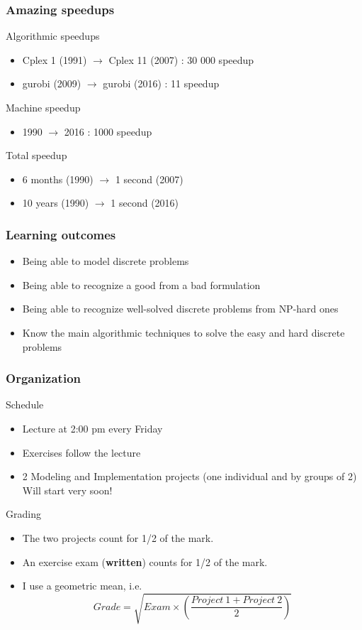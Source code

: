 \documentclass[9pt,handout]{beamer}
\begin{document}
\begin{frame}
\frametitle{Amazing speedups}
\begin{block}{Algorithmic speedups}
\begin{itemize}
\item Cplex 1 (1991) $\rightarrow$ Cplex 11 (2007) : 30 000 speedup
\item gurobi (2009) $\rightarrow$ gurobi (2016) : 11 speedup
\end{itemize}
\end{block}
\begin{block}{Machine speedup}
\begin{itemize}
\item 1990 $\rightarrow$ 2016 : 1000 speedup
\end{itemize}
\end{block}
\begin{block}{Total speedup}
\begin{itemize}
\item 6 months (1990) $\rightarrow$ 1 second (2007)
\item 10 years (1990) $\rightarrow$ 1 second (2016)
\end{itemize}
\end{block}
\end{frame}
\begin{frame}
\frametitle{Learning outcomes}
\begin{itemize}
\item Being able to \alert{model} discrete problems\bigskip
\item Being able to recognize a \alert{good} from a \alert{bad} formulation\bigskip
\item Being able to recognize \alert{well-solved} discrete problems
from \alert{NP-hard} ones\bigskip
\item Know the main algorithmic techniques to solve the easy and hard discrete problems\bigskip
\end{itemize}
\end{frame}
\begin{frame}
\frametitle{Organization}
\begin{block}{Schedule}
\begin{itemize}
\item<1-> Lecture at 2:00 pm every Friday
\item<1-> Exercises follow the lecture 
\item<1-> 2 Modeling and Implementation projects (one individual and by groups of 2)\\
Will start very soon!
\end{itemize}
\end{block}
\begin{block}{Grading}
\begin{itemize}
\item<2-> The two projects count for 1/2 of the mark.
\item<2-> An exercise exam (\textbf{written}) counts for 1/2 of the mark.
\item<2-> I use a geometric mean, i.e.
$$ Grade = \sqrt{Exam \times (\frac{Project\ 1+Project\ 2}{2})} $$
\end{itemize}
\end{block}
\end{frame}
\end{document}
